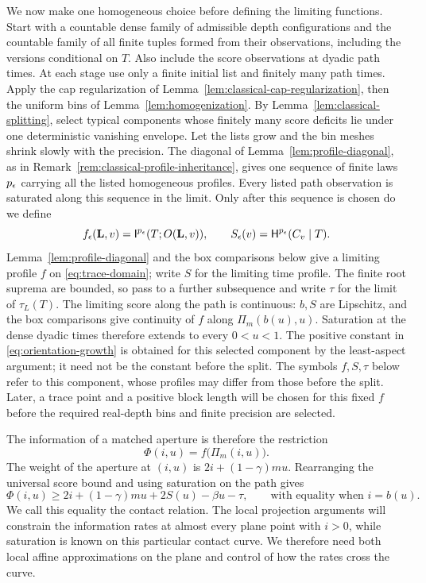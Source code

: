 We now make one homogeneous choice before defining the limiting
functions.  Start with a countable dense family of admissible depth
configurations and the countable family of all finite tuples formed
from their observations, including the versions conditional on $T$.
Also include the score observations at dyadic path times.  At each
stage use only a finite initial list and finitely many path times.
Apply the cap regularization of
Lemma~\ref{lem:classical-cap-regularization}, then the uniform bins of
Lemma~\ref{lem:homogenization}.  By
Lemma~\ref{lem:classical-splitting}, select typical components whose
finitely many score deficits lie under one deterministic vanishing
envelope.  Let the lists grow and the bin
meshes shrink slowly with the precision.  The diagonal of
Lemma~\ref{lem:profile-diagonal}, as in
Remark~\ref{rem:classical-profile-inheritance}, gives one sequence of
finite laws $p_\epsilon$ carrying all the listed homogeneous profiles.
Every listed path observation is saturated along this sequence in the limit.
Only after this sequence is chosen do we define
\[
 f_\epsilon(\mathbf L,v)=\mathsf I^{p_\epsilon}(T;O(\mathbf L,v)),\qquad
 S_\epsilon(v)=\mathsf H^{p_\epsilon}(C_v\mid T).
\]
Lemma~\ref{lem:profile-diagonal} and the box comparisons below give a
limiting profile $f$ on \eqref{eq:trace-domain}; write $S$ for the
limiting time profile.  The finite root suprema are bounded, so pass to
a further subsequence and write $\tau$ for the limit of $\tau_L(T)$.
The limiting score along the path is continuous: $b,S$ are Lipschitz,
and the box comparisons give continuity of $f$ along
$\Pi_m(b(u),u)$.  Saturation at the dense dyadic times therefore
extends to every $0<u<1$.  The
positive constant in \eqref{eq:orientation-growth} is obtained for
this selected component by the least-aspect argument; it need not be
the constant before the split.  The symbols $f,S,\tau$ below refer to
this component, whose profiles may differ from those before the split.
Later, a trace point and a positive block length
will be chosen for this fixed $f$ before the required real-depth bins
and finite precision are selected.

The information of a matched aperture is therefore the restriction
\begin{equation}\label{eq:matched-plane-profile}
 \Phi(i,u)=f\bigl(\Pi_m(i,u)\bigr).
\end{equation}
The weight of the aperture at $(i,u)$ is $2i+(1-\gamma)mu$.
Rearranging the universal score bound and using saturation on the
path gives
\begin{equation}
 \Phi(i,u)\ge
 2i+(1-\gamma)mu+2S(u)-\beta u-\tau,
 \qquad\text{with equality when }i=b(u).
 \label{eq:closure-obstacle}
\end{equation}
We call this equality the contact relation.  The local projection
arguments will constrain the information rates at almost every plane
point with $i>0$, while saturation is known on this particular contact
curve.  We therefore need both local affine approximations on the
plane and control of how the rates cross the curve.

